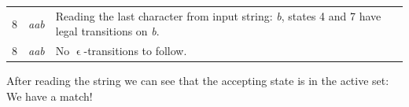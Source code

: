 \begin{example}
\begin{center}
\begin{tabular}{ccp{8.5cm}}
8 & \textsl{aab\underline{ }} & Reading the last character from input
string: \textsl{b}, states 4 and 7 have legal transitions on
\textsl{b}. \\

8 & \textsl{aab\underline{ }} & No $\upvarepsilon$-transitions to follow.

\end{tabular}
\end{center}

After reading the string we can see that the accepting state is in the
active set: We have a match!

\end{example}

